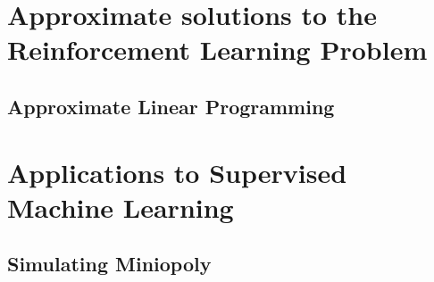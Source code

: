 \documentclass[colorful]{sty/itam-thesis}
\begin{document}
\part{Approximate solutions to the Reinforcement Learning 
Problem}

\chapter{Approximate Linear Programming}
% 


\part{Applications to Supervised Machine Learning}

\appendix

\chapter{Simulating Miniopoly}


\nocite{*}
\printbibliography
\end{document}

